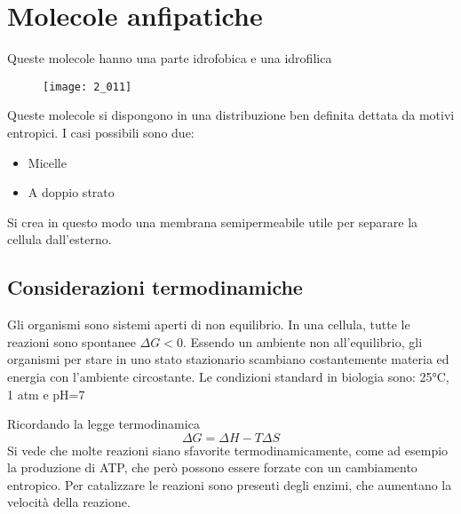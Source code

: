 
\section{Molecole anfipatiche}

Queste molecole hanno una parte idrofobica e una idrofilica

\begin{figure}[H]
    \centering
    \texttt{[image: 2\_011]}
\end{figure}

Queste molecole si dispongono in una distribuzione ben definita dettata
da motivi entropici. I casi possibili sono due:
\begin{itemize}
    \item Micelle 
    \item A doppio strato
\end{itemize} 

Si crea in questo modo una membrana semipermeabile utile per separare la
cellula dall'esterno.


\subsection{Considerazioni termodinamiche}

Gli organismi sono sistemi aperti di non equilibrio. In una cellula, tutte le reazioni sono spontanee \(\Delta G < 0\). Essendo un ambiente non all'equilibrio, gli organismi per stare in uno
stato stazionario scambiano costantemente materia ed energia con
l'ambiente circostante.
Le condizioni standard in biologia sono: 25°C, 1 atm e pH=7

Ricordando la legge termodinamica
\[
\Delta G = \Delta H - T\Delta S
\]
Si vede che molte reazioni siano sfavorite termodinamicamente, come
ad esempio la produzione di ATP, che però possono essere forzate con un
cambiamento entropico. Per catalizzare le reazioni sono presenti degli
enzimi, che aumentano la velocità della reazione.{}